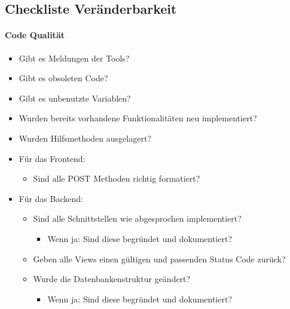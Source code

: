 \documentclass[accentcolor=tud0b,12pt,paper=a4]{tudexercise}
\begin{document}
\subsection*{Checkliste Veränderbarkeit}
\paragraph{Code Qualität}
	
	\renewcommand{\labelitemi}{\scriptsize$\square$}	\renewcommand{\labelitemii}{\scriptsize$\square$}
	\renewcommand{\labelitemiii}{\scriptsize$\square$}
	\begin{itemize}
		
		\item Gibt es Meldungen der Tools?
		\item Gibt es obsoleten Code?
		\item Gibt es unbenutzte Variablen?
		\item Wurden bereits vorhandene Funktionalitäten neu implementiert?
		\item Wurden Hilfsmethoden ausgelagert?
		\item Für das Frontend:
		\begin{itemize}
			
			\item Sind alle POST Methoden richtig formatiert?
		\end{itemize}
		\item Für das Backend:
		\begin{itemize}
			
			\item Sind alle Schnittstellen wie abgesprochen implementiert?
			\begin{itemize}
				
				\item Wenn ja: Sind diese begründet und dokumentiert?
			\end{itemize}
			\item Geben alle Views einen gültigen und passenden Status Code zurück?
			\item Wurde die Datenbankenstruktur geändert?
			\begin{itemize}
				
				\item Wenn ja: Sind diese begründet und dokumentiert?
			\end{itemize}
		\end{itemize}

	\end{itemize}
\end{document}
